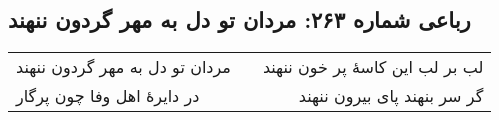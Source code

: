 \begin{center}
\section*{رباعی شماره ۲۶۳: مردان تو دل به مهر گردون ننهند}
\label{sec:sh263}
\begin{longtable}{l p{0.5cm} r}
مردان تو دل به مهر گردون ننهند
&&
لب بر لب این کاسهٔ پر خون ننهند
\\
در دایرهٔ اهل وفا چون پرگار
&&
گر سر بنهند پای بیرون ننهند
\\
\end{longtable}
\end{center}
